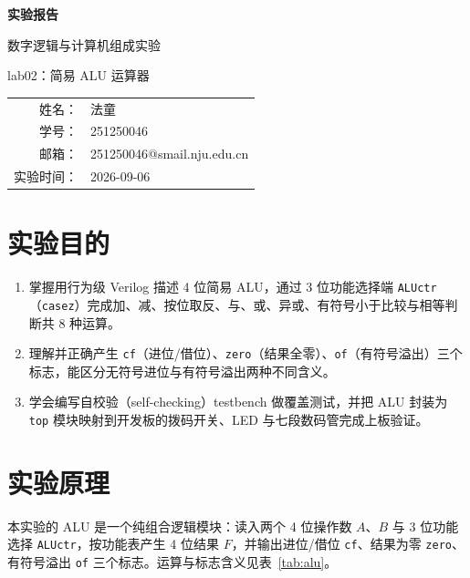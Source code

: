 \documentclass[12pt, a4paper]{ctexart}
\makeatletter
\newcommand{\coursename}{数字逻辑与计算机组成实验}
\newcommand{\expname}{lab02：简易 ALU 运算器}
\newcommand{\expdate}{2026-09-06}
\newcommand{\stuname}{法童}
\newcommand{\stuid}{251250046}
\newcommand{\stumail}{251250046@smail.nju.edu.cn}
\makeatother
\begin{document}
\begin{titlepage}
    \centering
    \vspace*{4cm}
    {\Huge\bfseries 实验报告\par}
    \vspace{1.5cm}
    {\Large \coursename\par}
    \vspace{0.8cm}
    {\Large \expname\par}
    \vspace{3cm}
    {\large
    \begin{tabular}{rl}
        姓名： & \stuname \\
        学号： & \stuid \\
        邮箱： & \stumail \\
        实验时间： & \expdate \\
    \end{tabular}\par}
\end{titlepage}

\section{实验目的}
\begin{enumerate}
    \item 掌握用行为级 Verilog 描述 4 位简易 ALU，通过 3 位功能选择端 \texttt{ALUctr}（\texttt{casez}）完成加、减、按位取反、与、或、异或、有符号小于比较与相等判断共 8 种运算。
    \item 理解并正确产生 \texttt{cf}（进位/借位）、\texttt{zero}（结果全零）、\texttt{of}（有符号溢出）三个标志，能区分无符号进位与有符号溢出两种不同含义。
    \item 学会编写自校验（self-checking）testbench 做覆盖测试，并把 ALU 封装为 \texttt{top} 模块映射到开发板的拨码开关、LED 与七段数码管完成上板验证。
\end{enumerate}

\section{实验原理}
本实验的 ALU 是一个纯组合逻辑模块：读入两个 4 位操作数 $A$、$B$ 与 3 位功能选择 \texttt{ALUctr}，按功能表产生 4 位结果 $F$，并输出进位/借位 \texttt{cf}、结果为零 \texttt{zero}、有符号溢出 \texttt{of} 三个标志。运算与标志含义见表~\ref{tab:alu}。
\end{document}
